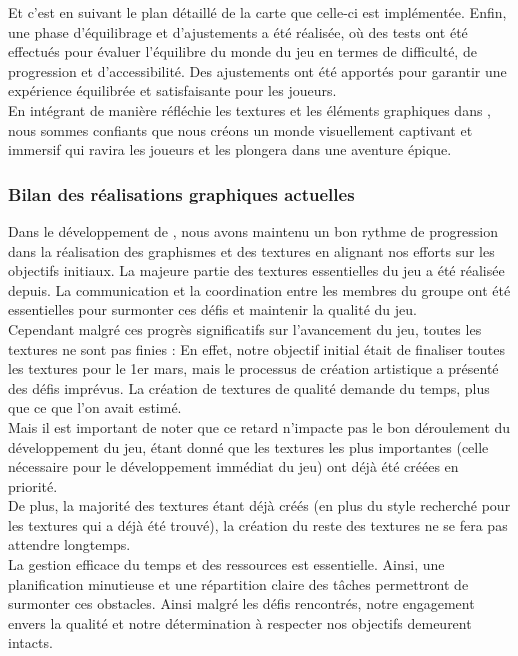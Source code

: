 Et c'est en suivant le plan détaillé de la carte que celle-ci est implémentée.
Enfin, une phase d'équilibrage et d'ajustements a été réalisée, où des tests ont été effectués pour évaluer l'équilibre du monde du jeu en termes de difficulté, de progression et d'accessibilité.
Des ajustements ont été apportés pour garantir une expérience équilibrée et satisfaisante pour les joueurs.
\\

En intégrant de manière réfléchie les textures et les éléments graphiques dans \gameName, nous sommes confiants que nous créons un monde visuellement captivant et immersif qui ravira les joueurs et les plongera dans une aventure épique.


\subsubsection*{\hspace*{0.6cm}Bilan des réalisations graphiques actuelles}

Dans le développement de \gameName, nous avons maintenu un bon rythme de progression dans la réalisation des graphismes et des textures en alignant nos efforts sur les objectifs initiaux. La majeure partie des textures essentielles du jeu a été réalisée depuis.
La communication et la coordination entre les membres du groupe ont été essentielles pour surmonter ces défis et maintenir la qualité du jeu.
\\

Cependant malgré ces progrès significatifs sur l'avancement du jeu, toutes les textures ne sont pas finies : En effet, notre objectif initial était de finaliser toutes les textures pour le 1er mars, mais le processus de création artistique a présenté des défis imprévus.
La création de textures de qualité demande du temps, plus que ce que l'on avait estimé.
\\

Mais il est important de noter que ce retard n'impacte pas le bon déroulement du développement du jeu, étant donné que les textures les plus importantes (celle nécessaire pour le développement immédiat du jeu) ont déjà été créées en priorité.
\\

De plus, la majorité des textures étant déjà créés (en plus du style recherché pour les textures qui a déjà été trouvé), la création du reste des textures ne se fera pas attendre longtemps.
\\

La gestion efficace du temps et des ressources est essentielle.
Ainsi, une planification minutieuse et une répartition claire des tâches permettront de surmonter ces obstacles.
Ainsi malgré les défis rencontrés, notre engagement envers la qualité et notre détermination à respecter nos objectifs demeurent intacts.


